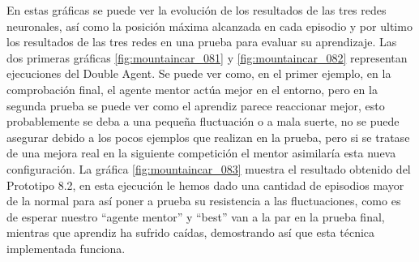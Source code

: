 En estas gráficas se puede ver la evolución de los resultados de las tres redes neuronales, así como la posición máxima alcanzada en cada episodio y por ultimo los resultados de las tres redes en una prueba para evaluar su aprendizaje.
Las dos primeras gráficas \ref{fig:mountaincar_081} y \ref{fig:mountaincar_082} representan ejecuciones del Double Agent. Se puede ver como, en el primer ejemplo, en la comprobación final, el agente mentor actúa mejor en el entorno, pero en la segunda prueba se puede ver como el aprendiz parece reaccionar mejor, esto probablemente se deba a una pequeña fluctuación o a mala suerte, no se puede asegurar debido a los pocos ejemplos que realizan en la prueba, pero si se tratase de una mejora real en la siguiente competición el mentor asimilaría esta nueva configuración.
La gráfica \ref{fig:mountaincar_083} muestra el resultado obtenido del Prototipo 8.2, en esta ejecución le hemos dado una cantidad de episodios mayor de la normal para así poner a prueba su resistencia a las fluctuaciones, como es de esperar nuestro ``agente mentor'' y ``best'' van a la par en la prueba final, mientras que aprendiz ha sufrido caídas, demostrando así que esta técnica implementada funciona. 



